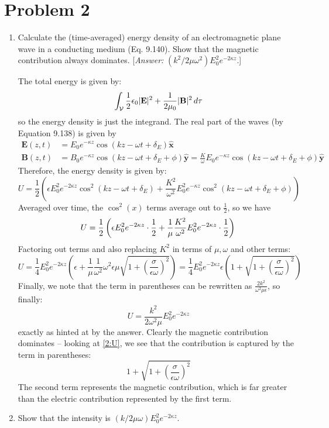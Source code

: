 \documentclass[10pt]{article}
\begin{document}
	\section*{Problem 2}
	\begin{enumerate}[label=(\alph*)]
		\item Calculate the (time-averaged) energy density of an electromagnetic plane wave in a conducting
			medium (Eq. 9.140). Show that the magnetic contribution always dominates. [\textit{Answer:} \(
			(k^2 / 2 \mu \omega^2) E_0^2 e^{-2 \kappa z} \).]

			\begin{solution}
				The total energy is given by:
				\[
					\int_{\mathcal{V}} \frac{1}{2}\epsilon_0|\mathbf{E}|^2 + \frac{1}{2\mu_0}|\mathbf{B}|^2
					\,d \tau 
				\]
				so the energy density is just the integrand. The real part of the waves (by Equation 9.138)
				is given by
				\begin{align*}
					\mathbf{E}(z, t) &= E_0e^{-\kappa z}\cos(kz - \omega t + \delta_E) \mathbf{\hat{x}}\\
					\mathbf{B}(z, t) &= B_0e^{-\kappa z}\cos(kz - \omega t + \delta_E + \phi) \mathbf{\hat{y}} 
					= \frac{K}{\omega}
					E_0e^{-\kappa z}\cos(kz - \omega t + \delta_E + \phi) \mathbf{\hat{y}}
				\end{align*}
				Therefore, the energy density is given by:
				\[
					U = \frac{1}{2}\left( \epsilon E_0^2 e^{-2\kappa z}\cos^2(kz - \omega t + \delta_E) +
					\frac{K^2}{\omega^2} E_0^2 e^{-\kappa z }\cos^2(kz - \omega t + \delta_E + \phi) \right)
				\]
				Averaged over time, the \( \cos^2(x) \) terms average out to \( \frac{1}{2} \), so we have
				\[
					U = \frac{1}{2}\left( \epsilon E_0^2 e^{-2\kappa z} \cdot \frac{1}{2} +
					\frac{1}{\mu}\frac{K^2}{\omega^2} E_0^2 e^{-2\kappa z} \cdot \frac{1}{2} \right)\\
				\]
				Factoring out terms and also replacing \( K^2 \) in terms of \( \mu, \omega \) and other
				terms:
				\begin{equation}
					\label{2:U}
					U = \frac{1}{4}E_0^2 e^{-2\kappa z}\left( \epsilon +
					\frac{1}{\mu}\frac{1}{\omega^2}\omega^2 \epsilon \mu\sqrt{1 + \left(
				\frac{\sigma}{\epsilon \omega} \right)^2} \right) = \frac{1}{4}E_0^2 e^{-2\kappa z} \epsilon
				\left( 1 + \sqrt{1 + \left( \frac{\sigma}{\epsilon \omega} \right)^2} \right)
				\end{equation}
				Finally, we note that the term in parentheses can be rewritten as \( \frac{2k^2}{\omega^2 \mu
				\epsilon} \), so finally:
				\[
					U = \frac{k^2}{2 \omega^2 \mu} E_0^2 e^{-2\kappa z}
				\]
				exactly as hinted at by the answer. Clearly the magnetic contribution dominates -- looking at
				\ref{2:U}, we see that the contribution is captured by the term in parentheses:
				\[
					1 + \sqrt{1 + \left( \frac{\sigma}{\epsilon \omega} \right)^2}
				\]
				The second term represents the magnetic contribution, which is far greater than the electric
				contribution represented by the first term. 
			\end{solution}
		\item Show that the intensity is \( (k / 2 \mu \omega) E_0^2 e^{-2 \kappa z} \). 


\end{enumerate}
\end{document}
